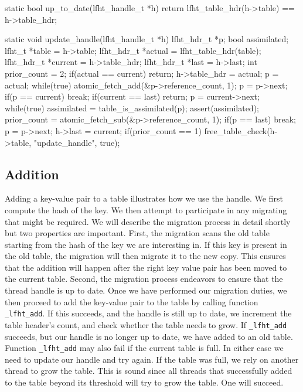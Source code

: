 \begin{center}
\begin{clisting}
static bool up\_to_date(lfht_handle_t *h){
  return lfht_table_hdr(h->table) == h->table_hdr;
}

static void update_handle(lfht_handle_t *h){
  lfht_hdr_t *p;
  bool assimilated;
  lfht_t *table = h->table;
  lfht_hdr_t *actual = lfht_table_hdr(table);
  lfht_hdr_t *current  = h->table_hdr;
  lfht_hdr_t *last = h->last;
  int prior_count = 2;
  if(actual == current){
    return;
  }
  h->table_hdr = actual;
  p = actual;
  while(true){
    atomic_fetch_add(&p->reference_count, 1);
    p = p->next;
    if(p == current){ break; }
  }
  if(current == last){  return; }
  p = current->next;
  while(true){
    assimilated = table_is_assimilated(p);
    assert(assimilated);
    prior_count = atomic_fetch_sub(&p->reference_count, 1);
    if(p == last){ break; }
    p = p->next;
  }
  h->last = current;
  if(prior_count == 1){
    free_table_check(h->table, "update_handle", true);
  }
}
\end{clisting}
\end{center}

\subsection{Addition}

Adding a key-value pair to a table illustrates how we use the
handle. We first compute the hash of the key. We then attempt to
participate in any migrating that might be required. We will describe
the migration process in detail shortly but two properties are
important.  First, the migration scans the old table starting from the
hash of the key we are interesting in. If this key is present in the
old table, the migration will then migrate it to the new copy. This
ensures that the addition will happen after the right key value pair
has been moved to the current table. Second, the migration process
endeavors to ensure that the thread handle is up to date.  Once we
have performed our migration duties, we then proceed to add the
key-value pair to the table by calling function \texttt{\_lfht\_add}.
If this succeeds, and the handle is still up to date, we increment the
table header's count, and check whether the table needs to grow.  If
\texttt{\_lfht\_add} succeeds, but our handle is no longer up to date,
we have added to an old table. Function \texttt{\_lfht\_add} may also fail
if the current table is full.
In either case we need to update our handle and try again. If the
table was full, we rely on another thread to grow the table. This is
sound since all threads that successfully added to the table beyond
its threshold will try to grow the table. One will succeed.

